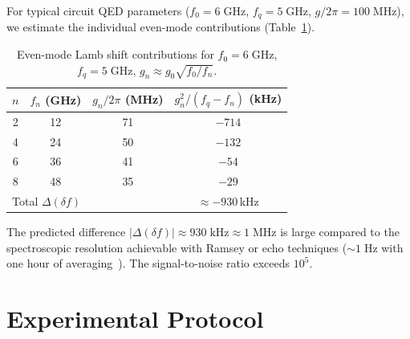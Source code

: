 \documentclass[aps,prl,twocolumn,superscriptaddress,nofootinbib]{revtex4-2}
\begin{document}
For typical circuit QED parameters ($f_0 = 6\;\mathrm{GHz}$,
$f_q = 5\;\mathrm{GHz}$, $g/2\pi = 100\;\mathrm{MHz}$), we
estimate the individual even-mode contributions (Table~\ref{tab:modes}).

\begin{table}[h]
\caption{Even-mode Lamb shift contributions
for $f_0=6\;\mathrm{GHz}$, $f_q=5\;\mathrm{GHz}$,
$g_n\approx g_0\sqrt{f_0/f_n}$.}
\label{tab:modes}
\begin{ruledtabular}
\begin{tabular}{cccc}
$n$ & $f_n$ (GHz) & $g_n/2\pi$ (MHz) & $g_n^2/(f_q{-}f_n)$ (kHz) \\
\hline
2 & 12 & 71 & $-714$ \\
4 & 24 & 50 & $-132$ \\
6 & 36 & 41 & $-54$ \\
8 & 48 & 35 & $-29$ \\
\hline
\multicolumn{3}{l}{Total $\Delta(\delta f)$} & $\approx -930$\,kHz \\
\end{tabular}
\end{ruledtabular}
\end{table}

The predicted difference $|\Delta(\delta f)|\approx 930\;\mathrm{kHz}
\approx 1\;\mathrm{MHz}$ is large compared to the spectroscopic
resolution achievable with Ramsey or echo techniques
($\sim 1\;\mathrm{Hz}$ with one hour of
averaging~\cite{Sank2016}).  The signal-to-noise ratio exceeds
$10^5$.

\section{Experimental Protocol}
\end{document}
